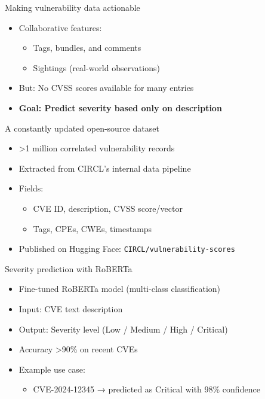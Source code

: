 \documentclass{beamer}
\begin{document}
\begin{frame}{Making vulnerability data actionable}
    \begin{itemize}
        \item Collaborative features:
            \begin{itemize}
                \item Tags, bundles, and comments
                \item Sightings (real-world observations)
            \end{itemize}
        \item But: No CVSS scores available for many entries
        \item \textbf{Goal: Predict severity based only on description}
    \end{itemize}
\end{frame}

\begin{frame}{A constantly updated open-source dataset}
    \begin{itemize}
        \item >1 million correlated vulnerability records
        \item Extracted from CIRCL's internal data pipeline
        \item Fields:
            \begin{itemize}
                \item CVE ID, description, CVSS score/vector
                \item Tags, CPEs, CWEs, timestamps
            \end{itemize}
        \item Published on Hugging Face: \texttt{CIRCL/vulnerability-scores}
    \end{itemize}
\end{frame}

\begin{frame}{Severity prediction with RoBERTa}
    \begin{itemize}
        \item Fine-tuned RoBERTa model (multi-class classification)
        \item Input: CVE text description
        \item Output: Severity level (Low / Medium / High / Critical)
        \item Accuracy >90\% on recent CVEs
        \item Example use case:
            \begin{itemize}
                \item CVE-2024-12345 → predicted as Critical with 98\% confidence
            \end{itemize}
    \end{itemize}
\end{frame}
\end{document}
